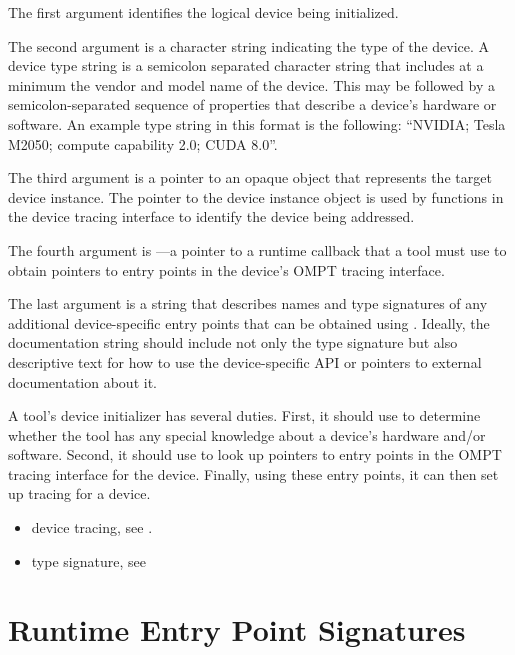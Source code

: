 \argdesc

The first argument identifies the logical device being initialized.

The second argument is a character string indicating the type of the
device. A device type string is a semicolon separated character string
that includes at a minimum the vendor and model name of the
device. This may be followed by a semicolon-separated sequence of
properties that describe a device's hardware or software.  An example
type string in this format is the following: ``NVIDIA; Tesla M2050;
compute capability 2.0; CUDA 8.0''.

The third argument is a pointer to an opaque object that represents
the target device instance. The pointer to the device instance object
is used by functions in the device tracing interface to identify the
device being addressed.

The fourth argument is ---a pointer to a runtime callback
that a tool must use to obtain pointers to entry points in the
device's OMPT tracing interface.

The last argument is a string that describes names and type signatures
of any additional device-specific entry points that can be obtained
using . Ideally, the documentation string should include
not only the type signature but also descriptive text for how to use
the device-specific API or pointers to external documentation about
it.

\effect

A tool's device initializer has several duties.  First, it should use
 to determine whether the tool has any special knowledge
about a device's hardware and/or software.  Second, it should use
 to look up pointers to entry points in the OMPT tracing
interface for the device.  Finally, using these entry points, it can
then set up tracing for a device.

\crossreferences
\begin{itemize}
\item device tracing, see
. 
\item {} type signature, see 
\end{itemize}

\section{Runtime Entry Point Signatures}

